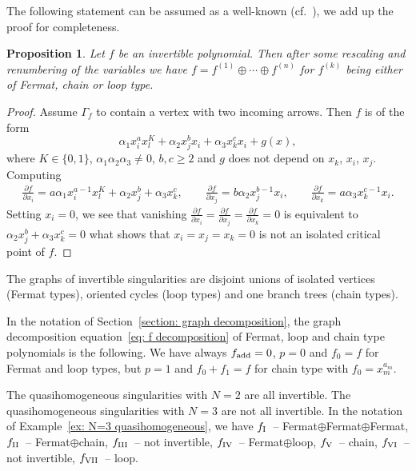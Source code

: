 \documentclass[10pt,a4paper]{amsart}
\numberwithin{equation}{section}
\newtheorem{Proposition}[Theorem]{Proposition}
 { \theoremstyle{definition}
\newtheorem{Definition}[Theorem]{Definition}
\newtheorem{Note}[Theorem]{Note}
\newtheorem{Example}[Theorem]{Example}
\newtheorem{Remark}[Theorem]{Remark} }
\def\p{\partial }
\begin{document}
The following statement can be assumed as a well-known (cf.~\cite{KS}), we add up the proof for completeness.
\begin{Proposition}\label{prop: invertible polynomial classification}
	Let $f$ be an invertible polynomial. Then after some rescaling and renumbering of the variables we have $f = f^{(1)} \oplus \cdots \oplus f^{(n)}$ for $f^{(k)}$ being either of Fermat, chain or loop type.
\end{Proposition}
\begin{proof}
Assume $\Gamma_f$ to contain a vertex with two incoming arrows. Then $f$ is of the form
\[
	\alpha_1 x_i^a x_l^K + \alpha_2 x_j^bx_i + \alpha_3 x_k^cx_i + g(x),
\]
where $K \in \{ 0,1\}$, $\alpha_1\alpha_2\alpha_3 \neq 0$, $b,c \ge 2$ and $g$ does not depend on $x_k$, $x_i$, $x_j$. Computing
\begin{align*}
	\frac{\p f}{\p x_i}  = a \alpha_1 x_i^{a-1} x_l^K + \alpha_2 x_j^b + \alpha_3 x_k^c,
	\qquad
	\frac{\p f}{\p x_j}  = b \alpha_2 x_j^{b-1}x_i,
	\qquad
	\frac{\p f}{\p x_k} = a \alpha_3 x_k^{c-1}x_i.
\end{align*}
Setting $x_i = 0$, we see that vanishing $\frac{\p f}{\p x_i} = \frac{\p f}{\p x_j} =\frac{\p f}{\p x_k} =0$ is equivalent to $\alpha_2 x_j^b + \alpha_3 x_k^c = 0$ what shows that $x_i=x_j=x_k=0$ is not an isolated critical point of $f$.
\end{proof}

The graphs of invertible singularities are disjoint unions of isolated vertices (Fermat types), oriented cycles (loop types) and one branch trees (chain types).

In the notation of Section~\ref{section: graph decomposition}, the graph decomposition equation~\eqref{eq: f decomposition} of Fermat, loop and chain type polynomials is the following. We have always $f_{\rm add} = 0$, $p=0$ and $f_0 = f$ for Fermat and loop types, but $p=1$ and $f_0 + f_1 = f$ for chain type with $f_0 = x_m^{a_m}$.

\begin{Example}
 The quasihomogeneous singularities with $N=2$ are all invertible.
	The quasihomogeneous singularities with $N=3$ are not all invertible. In the notation of Example~\ref{ex: N=3 quasihomogeneous}, we have $f_{\rm I}$~-- Fermat$\oplus$Fermat$\oplus$Fermat, $f_{\rm II}$~-- Fermat$\oplus$chain, $f_{\rm III}$~-- not invertible, $f_{\rm IV} $~-- Fermat$\oplus$loop,
	$f_{\rm V}$~-- chain, $f_{\rm VI}$~-- not invertible, $f_{\rm VII}$~-- loop.
\end{Example}
\end{document}
